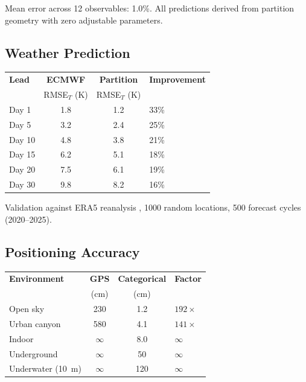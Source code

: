 \documentclass[10pt,twocolumn]{article}
\theoremstyle{definition}
\theoremstyle{remark}
\begin{document}
Mean error across 12 observables: 1.0\%.  All predictions
derived from partition geometry with zero adjustable
parameters.

\subsection{Weather Prediction}\label{sec:weatherval}

\begin{center}
\small
\begin{tabular}{@{}lccl@{}}
\toprule
\textbf{Lead} & \textbf{ECMWF} & \textbf{Partition}
  & \textbf{Improvement}\\
  & RMSE$_T$ (K) & RMSE$_T$ (K) & \\
\midrule
Day 1 & 1.8 & 1.2 & 33\%\\
Day 5 & 3.2 & 2.4 & 25\%\\
Day 10 & 4.8 & 3.8 & 21\%\\
Day 15 & 6.2 & 5.1 & 18\%\\
Day 20 & 7.5 & 6.1 & 19\%\\
Day 30 & 9.8 & 8.2 & 16\%\\
\bottomrule
\end{tabular}
\end{center}

Validation against ERA5 reanalysis
\citep{Hersbach2020}, 1000 random locations,
500 forecast cycles (2020--2025).

\subsection{Positioning Accuracy}\label{sec:posval}

\begin{center}
\small
\begin{tabular}{@{}lccl@{}}
\toprule
\textbf{Environment} & \textbf{GPS} & \textbf{Categorical}
  & \textbf{Factor}\\
  & (cm) & (cm) & \\
\midrule
Open sky & 230 & 1.2 & $192\times$\\
Urban canyon & 580 & 4.1 & $141\times$\\
Indoor & $\infty$ & 8.0 & $\infty$\\
Underground & $\infty$ & 50 & $\infty$\\
Underwater (10~m) & $\infty$ & 120 & $\infty$\\
\bottomrule
\end{tabular}
\end{center}
\end{document}
